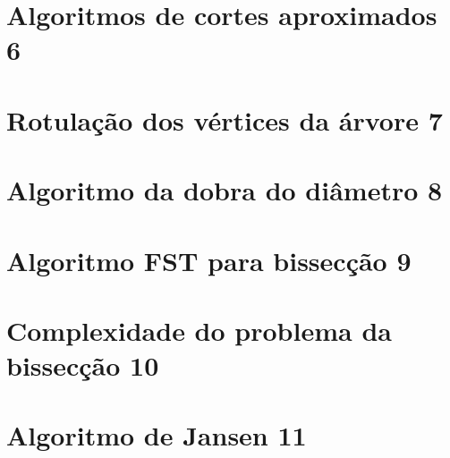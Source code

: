 \documentclass[a4paper,12pt]{article}
\begin{document}
    
\newpage
\section {Algoritmos de cortes aproximados 6}


\section {Rotulação dos vértices da árvore 7}


\section {Algoritmo da dobra do diâmetro 8}


\section {Algoritmo FST para bissecção 9}



\section {Complexidade do problema da bissecção 10}



\section {Algoritmo de Jansen 11}
\end{document}
